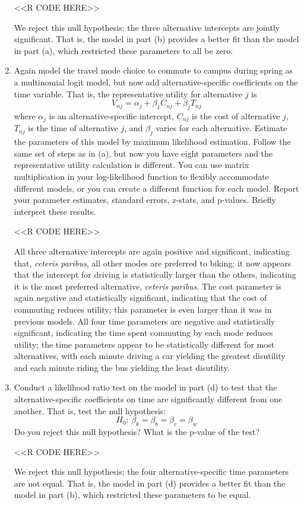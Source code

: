 \documentclass[11pt,letterpaper]{article}
\begin{document}
\begin{enumerate}[label=\alph*., leftmargin=*]
	<<R CODE HERE>>

	We reject this null hypothesis; the three alternative intercepts are jointly significant. That is, the model in part (b) provides a better fit than the model in part (a), which restricted these parameters to all be zero.
	
	\item Again model the travel mode choice to commute to campus during spring as a multinomial logit model, but now add alternative-specific coefficients on the time variable. That is, the representative utility for alternative $j$ is
	$$V_{nj} = \alpha_j + \beta_1 C_{nj} + \beta_j T_{nj}$$
	where $\alpha_j$ is an alternative-specific intercept, $C_{nj}$ is the cost of alternative $j$, $T_{nj}$ is the time of alternative $j$, and $\beta_j$ varies for each alternative. Estimate the parameters of this model by maximum likelihood estimation. Follow the same set of steps as in (a), but now you have eight parameters and the representative utility calculation is different. You can use matrix multiplication in your log-likelihood function to flexibly accommodate different models, or you can create a different function for each model. Report your parameter estimates, standard errors, z-stats, and p-values. Briefly interpret these results.

	<<R CODE HERE>>

	All three alternative intercepts are again positive and significant, indicating that, \emph{ceteris paribus}, all other modes are preferred to biking; it now appears that the intercept for driving is statistically larger than the others, indicating it is the most preferred alternative, \emph{ceteris paribus}. The cost parameter is again negative and statistically significant, indicating that the cost of commuting reduces utility; this parameter is even larger than it was in previous models. All four time parameters are negative and statistically significant, indicating the time spent commuting by each mode reduces utility; the time parameters appear to be statistically different for most alternatives, with each minute driving a car yielding the greatest disutility and each minute riding the bus yielding the least disutility.
	
	\item Conduct a likelihood ratio test on the model in part (d) to test that the alternative-specific coefficients on time are significantly different from one another. That is, test the null hypothesis:
	$$H_0 \text{: } \beta_k = \beta_b = \beta_c = \beta_w$$
	Do you reject this null hypothesis? What is the p-value of the test?

	<<R CODE HERE>>

	We reject this null hypothesis; the four alternative-specific time parameters are not equal. That is, the model in part (d) provides a better fit than the model in part (b), which restricted these parameters to be equal.
\end{enumerate}
\end{document}
